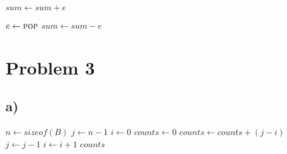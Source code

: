 \documentclass[12pt]{article}
\begin{document}
\begin{algorithm*}
    \begin{algorithmic}[1]
    
        \State $sum \gets sum + e$
        \State {}
    \EndFunction
    
    \end{algorithmic}
\end{algorithm*}

\begin{algorithm*}
    \begin{algorithmic}[1]
    
        \State $e \gets \Call{pop}{}$
        \State $sum \gets sum - e$
    \EndFunction
    
    \end{algorithmic}
\end{algorithm*}

\begin{algorithm*}
    \begin{algorithmic}[1]
    
        \State {}
    \EndFunction
    
    \end{algorithmic}
\end{algorithm*}


\newpage

\section*{Problem 3}
\subsection*{a)}
\begin{algorithm}
    \begin{algorithmic}[1]
        \State $n \gets sizeof(B)$
        \State $j \gets n - 1$
        \State $i \gets 0$
        \State $counts \gets 0$
                \State $counts \gets counts + (j - i)$
                \State $j \gets j - 1$
            \Else
                \State $i \gets i + 1$
            \EndIf
        \EndWhile
        \State \Return $counts$
    \EndFunction
    \end{algorithmic}
\end{algorithm}
\end{document}
